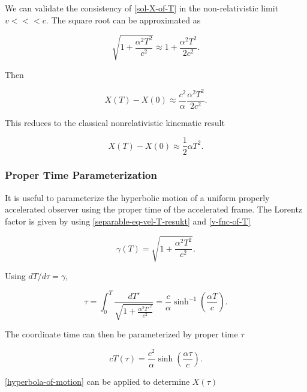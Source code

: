 \documentclass[11pt]{article}
\begin{document}
We can validate the consistency of \eqref{sol-X-of-T} in the non-relativistic limit $v <<< c$. The square root can be approximated as

\begin{equation}
    \label{newton-limit-hyperbolic-sqrt}
    \sqrt{1 + \frac{\alpha^2 T^2}{c^2}} \approx 1 + \frac{\alpha^2 T^2}{2c^2}.
\end{equation}

Then

\begin{equation}
    \label{newton-limit-1}
    X(T) - X(0) \approx \frac{c^2}{\alpha} \frac{\alpha^2 T^2}{2c^2}.
\end{equation}

This reduces to the classical nonrelativistic kinematic result

\begin{equation}
    \label{newton-limit-1}
    X(T) - X(0) \approx \frac{1}{2}\alpha T^2.
\end{equation}

\subsubsection{Proper Time Parameterization}

It is useful to parameterize the hyperbolic motion of a uniform properly accelerated observer using the proper time of the accelerated frame. The Lorentz factor is given by using \eqref{separable-eq-vel-T-resukt} and \eqref{v-fnc-of-T}

\begin{equation}
    \label{gamma-of-T}
    \gamma (T) = \sqrt{1 + \frac{\alpha^2 T^2}{c^2}}.
\end{equation}

Using $dT /d\tau = \gamma$,

\begin{equation}
    \label{propertime-integral}
    \tau = \int_0^T \frac{dT'}{\sqrt{1 + \frac{\alpha^2 T'^2}{c^2}}} = \frac{c}{\alpha} \sinh^{-1} \left( \frac{\alpha T}{c}\right).
\end{equation}

The coordinate time can then be parameterized by proper time $\tau$

\begin{equation}
    \label{T-of-tau}
    c T(\tau) = \frac{c^2}{\alpha} \sinh\left( \frac{\alpha \tau}{c}\right).
\end{equation}

\eqref{hyperbola-of-motion} can be applied to determine $X(\tau)$
\end{document}
